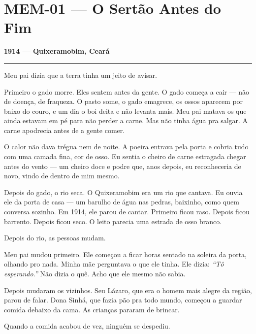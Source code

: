\section*{\textbf{MEM-01} --- O Sertão Antes do Fim}

\noindent \textbf{1914 --- Quixeramobim, Ceará}

\vspace{0.5em}\noindent\rule{\textwidth}{0.5pt}\vspace{0.5em}

\noindent Meu pai dizia que a terra tinha um jeito de avisar.

\noindent Primeiro o gado morre. Eles sentem antes da gente. O gado começa a cair --- não de doença, de fraqueza. O pasto some, o gado emagrece, os ossos aparecem por baixo do couro, e um dia o boi deita e não levanta mais. Meu pai matava os que ainda estavam em pé para não perder a carne. Mas não tinha água pra salgar. A carne apodrecia antes de a gente comer.

\noindent O calor não dava trégua nem de noite. A poeira entrava pela porta e cobria tudo com uma camada fina, cor de osso. Eu sentia o cheiro de carne estragada chegar antes do vento --- um cheiro doce e podre que, anos depois, eu reconheceria de novo, vindo de dentro de mim mesmo.

\noindent Depois do gado, o rio seca. O Quixeramobim era um rio que cantava. Eu ouvia ele da porta de casa --- um barulho de água nas pedras, baixinho, como quem conversa sozinho. Em 1914, ele parou de cantar. Primeiro ficou raso. Depois ficou barrento. Depois ficou seco. O leito parecia uma estrada de osso branco.

\noindent Depois do rio, as pessoas mudam.

\noindent Meu pai mudou primeiro. Ele começou a ficar horas sentado na soleira da porta, olhando pro nada. Minha mãe perguntava o que ele tinha. Ele dizia: \textit{\textquotedblleft{}Tô esperando.\textquotedblright{}} Não dizia o quê. Acho que ele mesmo não sabia.

\noindent Depois mudaram os vizinhos. Seu Lázaro, que era o homem mais alegre da região, parou de falar. Dona Sinhá, que fazia pão pra todo mundo, começou a guardar comida debaixo da cama. As crianças pararam de brincar.

\noindent Quando a comida acabou de vez, ninguém se despediu.

